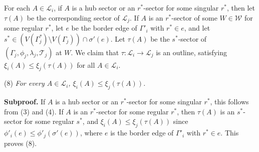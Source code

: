 For each $A \in \mathscr{L}_i$, if $A$ is a hub sector or an $r^*$-sector for some singular $r^*$, then let $\tau(A)$ be the corresponding sector of $\mathscr{L}_j$. If $A$ is an $r^*$-sector of some $W \in \mathscr{W}$ for some regular $r^*$, let $e$ be the border edge of $\Gamma'_i$ with $r^* \in e$, and let $s^* \in (V(\Gamma^*_j) \setminus V(\Gamma_j)) \cap \sigma'(e)$. Let $\tau(A)$ be the $s^*$-sector of $(\Gamma_j, \phi_j, \lambda_j, \mathscr{T}_j)$ at $W$. We claim that $\tau \colon \mathscr{L}_i \to \mathscr{L}_j$ is an outline, satisfying $\xi_i(A) \le \xi_j(\tau(A))$ for all $A \in \mathscr{L}_i$.

\hspace*{12pt}(8) \textit{For every $A \in \mathscr{L}_i$, $\xi_i(A) \le \xi_j(\tau(A))$.}

\textbf{Subproof.} If $A$ is a hub sector or an $r^*$-sector for some singular $r^*$, this follows from (3) and (4). If $A$ is an $r^*$-sector for some regular $r^*$, then $\tau(A)$ is an $s^*$-sector for some regular $s^*$, and $\xi_i(A) \le \xi_j(\tau(A))$ since $\phi'_i(e) \le \phi'_j(\sigma'(e))$, where $e$ is the border edge of $\Gamma'_i$ with $r^* \in e$. This proves (8).

